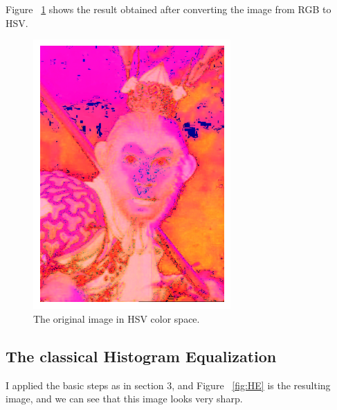 \documentclass{article}
\begin{document}
	Figure ~\ref{fig:hsv} shows the result obtained after converting the image from RGB to HSV.
	
	\begin{figure}
		\includegraphics[width=\linewidth]{img/HSV.png}
		\caption{The original image in HSV color space.}
		\label{fig:hsv}
	\end{figure}
	
	\subsection{The classical Histogram Equalization}
	
	I applied the basic steps as in section 3, and Figure ~\ref{fig:HE} is the resulting image, and we can see that this image looks very sharp.
	
\end{document}
